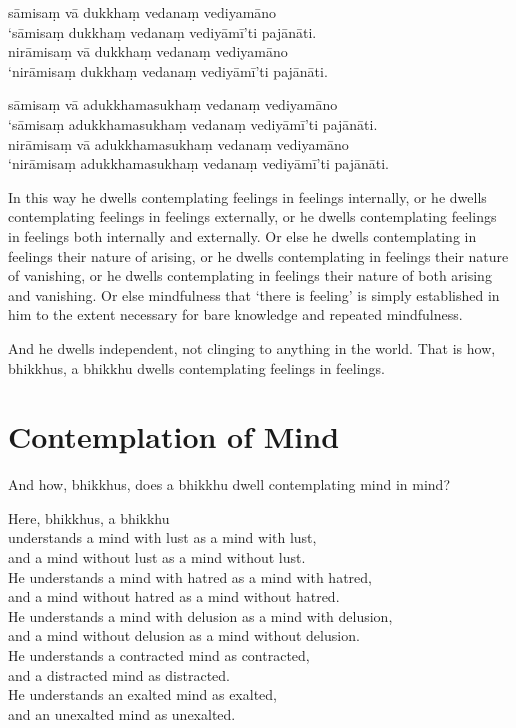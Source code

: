 sāmisaṃ vā dukkhaṃ vedanaṃ vediyamāno\\
‘sāmisaṃ dukkhaṃ vedanaṃ vediyāmī’ti pajānāti.\\
nirāmisaṃ vā dukkhaṃ vedanaṃ vediyamāno\\
‘nirāmisaṃ dukkhaṃ vedanaṃ vediyāmī’ti pajānāti.

sāmisaṃ vā adukkhamasukhaṃ vedanaṃ vediyamāno\\
‘sāmisaṃ adukkhamasukhaṃ vedanaṃ vediyāmī’ti pajānāti.\\
nirāmisaṃ vā adukkhamasukhaṃ vedanaṃ vediyamāno\\
‘nirāmisaṃ adukkhamasukhaṃ vedanaṃ vediyāmī’ti pajānāti.

\englishPage

In this way he dwells contemplating feelings in feelings internally, or he
dwells contemplating feelings in feelings externally, or he dwells contemplating
feelings in feelings both internally and externally. Or else he dwells
contemplating in feelings their nature of arising, or he dwells contemplating in
feelings their nature of vanishing, or he dwells contemplating in feelings their
nature of both arising and vanishing. Or else mindfulness that ‘there is
feeling’ is simply established in him to the extent necessary for bare knowledge
and repeated mindfulness.

And he dwells independent, not clinging to anything in the world. That is how,
bhikkhus, a bhikkhu dwells contemplating feelings in feelings.


\chapter{Contemplation of Mind}

And how, bhikkhus, does a bhikkhu dwell contemplating mind in mind?

Here, bhikkhus, a bhikkhu\\
understands a mind with lust as a mind with lust,\\
and a mind without lust as a mind without lust.\\
He understands a mind with hatred as a mind with hatred,\\
and a mind without hatred as a mind without hatred.\\
He understands a mind with delusion as a mind with delusion,\\
and a mind without delusion as a mind without delusion.\\
He understands a contracted mind as contracted,\\
and a distracted mind as distracted.\\
He understands an exalted mind as exalted,\\
and an unexalted mind as unexalted.

